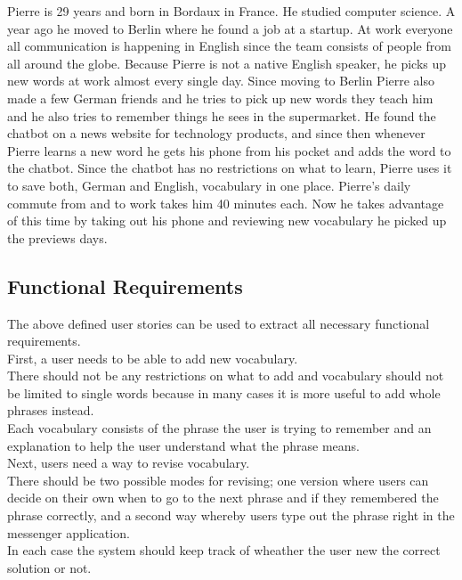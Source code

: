Pierre is 29 years and born in Bordaux in France.
He studied computer science.
A year ago he moved to Berlin where he found a job at a startup.
At work everyone all communication is happening in English since the team consists of people from all around the globe.
Because Pierre is not a native English speaker, he picks up new words at work almost every single day.
Since moving to Berlin Pierre also made a few German friends and he tries to pick up new words they teach him
and he also tries to remember things he sees in the supermarket.
He found the chatbot on a news website for technology products,
and since then whenever Pierre learns a new word he gets his phone from his pocket and adds the word to the chatbot.
Since the chatbot has no restrictions on what to learn, Pierre uses it to save both, German and English, vocabulary in one place.
Pierre's daily commute from and to work takes him 40 minutes each.
Now he takes advantage of this time by taking out his phone and reviewing new vocabulary he picked up the previews days.
\\


\subsection{Functional Requirements}
\label{funcreq}

The above defined user stories can be used to extract all necessary functional requirements.
\\

First, a user needs to be able to add new vocabulary.
\\
There should not be any restrictions on what to add
and vocabulary should not be limited to single words because in many cases it is more useful
to add whole phrases instead.
\\
Each vocabulary consists of the phrase the user is trying to remember
and an explanation to help the user understand what the phrase means.
\\

Next, users need a way to revise vocabulary.
\\
There should be two possible modes for revising;
one version where users can decide on their own when to go to the next phrase
and if they remembered the phrase correctly,
and a second way whereby users type out the phrase right in the messenger application.
\\
In each case the system should keep track of wheather the user new the correct solution or not.
\\

